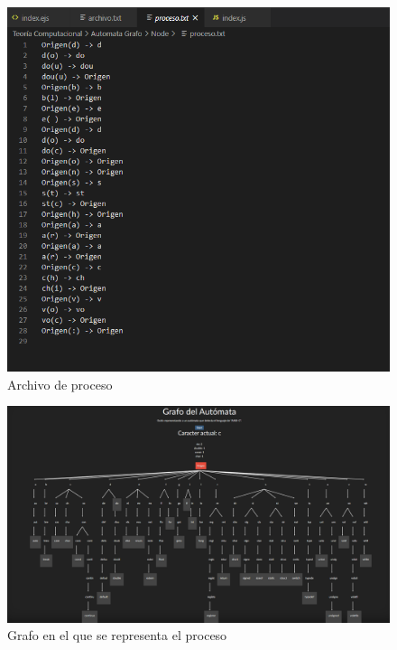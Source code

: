 \documentclass{article}
\begin{document}
		\begin{figure}[h]
    		\centering
    		\includegraphics[width=\textwidth]{proceso}
    		\caption{Archivo de proceso}
		\end{figure}
		\begin{figure}[h]
    		\centering
    		\includegraphics[width=\textwidth]{grafo}
    		\caption{Grafo en el que se representa el proceso}
		\end{figure}
\end{document}
